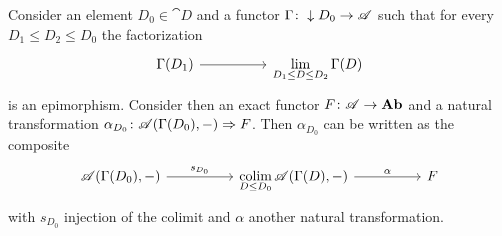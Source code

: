 \begin{lemma}
  \label{lemma:third_lemma}
  Consider an element \(D_0\in\cat{D}\) and a functor \(\Gamma\colon \downarrow D_0\to {\mathscr A}\) such that for every \(D_1\leq D_2\leq D_0\) the factorization
  \begin{equation*}
    \begin{tikzcd}[sep=huge]
      \Gamma(D_1) \ar[r, ""] & \displaystyle\lim_{D_1\leq D\leq D_2}\Gamma(D)
    \end{tikzcd}
  \end{equation*}
  is an epimorphism. Consider then an exact functor \(F\colon {\mathscr A}\to \text{\normalfont\textbf{Ab}}\) and a natural transformation \(\alpha_{D_0}\colon {\mathscr A}(\Gamma(D_0),-)\Rightarrow F\). Then \(\alpha_{D_0}\) can be written as the composite
  \begin{equation*}
    \begin{tikzcd}[sep=huge]
      \homset{\cat{A}}{\Gamma(D_0)}{-} \ar[r, "s_{D_0}"] & \displaystyle\colim_{D\leq D_0}\homset{\cat{A}}{\Gamma(D)}{-} \ar[r, "\alpha"] & F
    \end{tikzcd}
  \end{equation*}
  with \(s_{D_0}\) injection of the colimit and \(\alpha\) another natural transformation.
\end{lemma}


